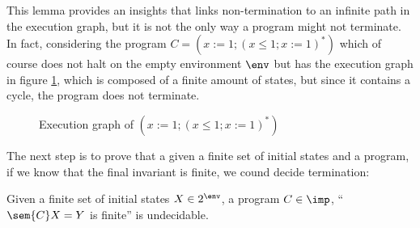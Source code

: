 \begin{example}
  This lemma provides an insights that links non-termination to an
  infinite path in the execution graph, but it is not the only way a
  program might not terminate. In fact, considering the program \(C =
  (x:=1; (x\leq 1; x:=1)^*)\) which of course does not halt on the
  empty environment \(\env\) but has the execution graph in figure
  \ref{fig:exegraphnont}, which is composed of a finite amount of
  states, but since it contains a cycle, the program does not
  terminate.

  \begin{figure}
    \centering
    \usetikzlibrary{positioning}
    \caption{Execution graph of \((x:=1; (x\leq 1;
      x:=1)^*)\)}\label{fig:exegraphnont}
  \end{figure}
\end{example}


The next step is to prove that a given a finite set of initial states
and a program, if we know that the final invariant is finite, we cound
decide termination:

\begin{lemma}
  Given a finite set of initial states \(X \in 2^\env\), a program
  \(C\in\imp\), ``\(\sem{C}X = Y\) is finite'' is undecidable.
\end{lemma}


